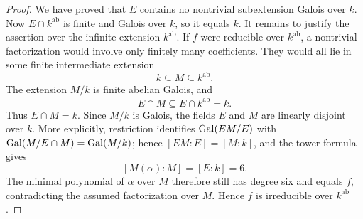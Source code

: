 \begin{proof}
We have proved that $E$ contains no nontrivial subextension Galois over
$k$.  Now $E\cap k^{\mathrm{ab}}$ is finite and Galois over $k$, so it
equals $k$.  It remains to justify the assertion over the infinite
extension $k^{\mathrm{ab}}$.  If $f$ were reducible over
$k^{\mathrm{ab}}$, a nontrivial factorization would involve only
finitely many coefficients.  They would all lie in some finite
intermediate extension
\[
 k\subseteq M\subseteq k^{\mathrm{ab}}.
\]
The extension $M/k$ is finite abelian Galois, and
\[
 E\cap M\subseteq E\cap k^{\mathrm{ab}}=k.
\]
Thus $E\cap M=k$.  Since $M/k$ is Galois, the fields $E$ and $M$ are
linearly disjoint over $k$.  More explicitly, restriction identifies
$\operatorname{Gal}(EM/E)$ with $\operatorname{Gal}(M/E\cap M)=\operatorname{Gal}(M/k)$; hence
$[EM:E]=[M:k]$, and the tower formula gives
\[
 [M(\alpha):M]=[E:k]=6.
\]
The minimal polynomial of $\alpha$ over $M$ therefore still has degree
six and equals $f$, contradicting the assumed factorization over $M$.
Hence $f$ is irreducible over $k^{\mathrm{ab}}$.
\end{proof}

